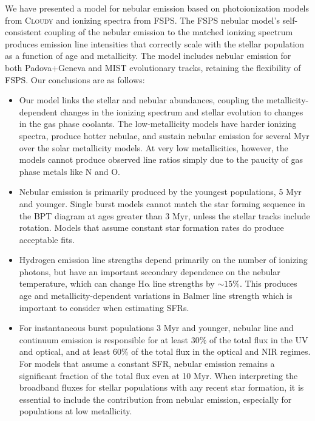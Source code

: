 \documentclass[linenumbers, tighten, trackchanges]{aastex61}%
\newcommand{\FSPS}{{\sc FSPS}\xspace}
\newcommand{\Cloudy}{\textsc{Cloudy}\xspace}
\newcommand{\ha}{\ensuremath{\mathrm{H\alpha}}}
\begin{document}
We have presented a model for nebular emission based on photoionization models from \Cloudy and ionizing spectra from \FSPS. The \FSPS nebular model's self-consistent coupling of the nebular emission to the matched ionizing spectrum produces emission line intensities that correctly scale with the stellar population as a function of age and metallicity. The model includes nebular emission for both Padova+Geneva and MIST evolutionary tracks, retaining the flexibility of \FSPS. Our conclusions are as follows:

\begin{itemize}
\item Our model links the stellar and nebular abundances, coupling the metallicity-dependent changes in the ionizing spectrum and stellar evolution to changes in the gas phase coolants. The low-metallicity models have harder ionizing spectra, produce hotter nebulae, and sustain nebular emission for several Myr over the solar metallicity models. At very low metallicities, however, the models cannot produce observed line ratios simply due to the paucity of gas phase metals like N and O.
\item Nebular emission is primarily produced by the youngest populations, 5 Myr and younger. Single burst models cannot match the star forming sequence in the BPT diagram at ages greater than 3 Myr, unless the stellar tracks include rotation. Models that assume constant star formation rates do produce acceptable fits.
\item Hydrogen emission line strengths depend primarily on the number of ionizing photons, but have an important secondary dependence on the nebular temperature, which can change \ha{} line strengths by $\sim15\%$. This produces age and metallicity-dependent variations in Balmer line strength which is important to consider when estimating SFRs.
\item For instantaneous burst populations 3 Myr and younger, nebular line and continuum emission is responsible for at least $30\%$ of the total flux in the UV and optical, and at least $60\%$ of the total flux in the optical and NIR regimes. For models that assume a constant SFR, nebular emission remains a significant fraction of the total flux even at 10 Myr. When interpreting the broadband fluxes for stellar populations with any recent star formation, it is essential to include the contribution from nebular emission, especially for populations at low metallicity. 

\end{itemize}
\end{document}
